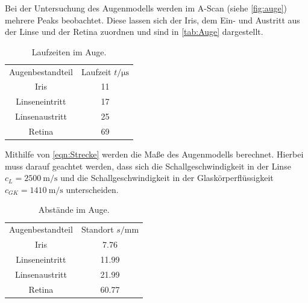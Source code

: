 Bei der Untersuchung des Augenmodells werden im A-Scan (siehe \autoref{fig:auge}) mehrere Peaks beobachtet.
Diese lassen sich der Iris, dem Ein- und Austritt aus der Linse und der Retina zuordnen und sind in \autoref{tab:Auge} dargestellt.
\begin{table}[H]
  \centering
  \caption{Laufzeiten im Auge.}
  \label{tab:Auge}
  \begin{tabular}{c S[table-format=2.0] }
  \toprule
  {Augenbestandteil} & {Laufzeit $t / \si{\micro\second}$} \\
    Iris            &  11 \\
    Linseneintritt  &  17 \\
    Linsenaustritt  &  25 \\
    Retina          &  69 \\
  \bottomrule
  \end{tabular}
\end{table}

Mithilfe von \autoref{eqn:Strecke} werden die Maße des Augenmodells berechnet. Hierbei muss darauf geachtet werden, dass sich
die Schallgeschwindigkeit in der Linse $c_L= \qty{2500}{\meter\per\second}$ und die Schallgeschwindigkeit in der Glaskörperflüssigkeit
$c_{GK}= \qty{1410}{\meter\per\second}$ unterscheiden.

\begin{table}[H]
  \centering
  \caption{Abstände im Auge.}
  \label{tab:Auge}
  \begin{tabular}{c S[table-format=2.2] }
  \toprule
  {Augenbestandteil} & {Standort $s / \si{\milli\meter}$} \\
  Iris            &  7.76\\
  Linseneintritt  &  11.99\\
  Linsenaustritt  &  21.99\\
  Retina          &  60.77\\
  \bottomrule
  \end{tabular}
\end{table}

